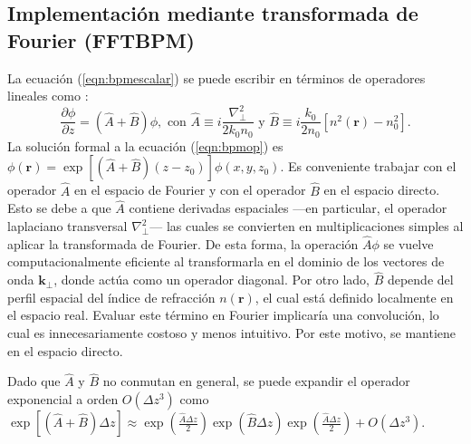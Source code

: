 \subsection{Implementación mediante transformada de Fourier (FFTBPM)}
La ecuación (\ref{eqn:bpmescalar}) se puede escribir en términos de operadores lineales como \citep{bpm}: 
\begin{equation}
	\frac{\partial \phi}{\partial z}  = \left(\hat{A} + \hat{B}\right)\phi, \text{ con } \hat{A} \equiv i\frac{\nabla^2_\perp}{2k_0n_0}\text{ y } \hat{B} \equiv i\frac{k_0}{2n_0}\left[n^2(\textbf{r})-n_0^2\right]. \label{eqn:bpmop}
\end{equation}
La solución formal a la ecuación (\ref{eqn:bpmop}) es $\phi(\textbf{r}) = \exp\left[\left(\hat{A} + \hat{B}\right)(z-z_0)\right]\phi(x, y, z_0)$. Es conveniente trabajar con el operador \( \hat{A} \) en el espacio de Fourier y con el operador \( \hat{B} \) en el espacio directo. Esto se debe a que \( \hat{A} \) contiene derivadas espaciales —en particular, el operador laplaciano transversal \( \nabla^2_\perp \)— las cuales se convierten en multiplicaciones simples al aplicar la transformada de Fourier. De esta forma, la operación \( \hat{A} \phi \) se vuelve computacionalmente eficiente al transformarla en el dominio de los vectores de onda \( \textbf{k}_\perp \), donde actúa como un operador diagonal. Por otro lado, \( \hat{B} \) depende del perfil espacial del índice de refracción \( n(\textbf{r}) \), el cual está definido localmente en el espacio real. Evaluar este término en Fourier implicaría una convolución, lo cual es innecesariamente costoso y menos intuitivo. Por este motivo, se mantiene en el espacio directo. 

Dado que $\hat{A}$ y $\hat{B}$ no conmutan en general, se puede expandir el operador exponencial a orden $O(\Delta z ^3)$ como $\exp\left[\left(\hat{A} + \hat{B}\right)\Delta z \right] \approx \exp\left(\frac{\hat{A}\Delta z}{2} \right)\exp\left(\hat{B}\Delta z \right)\exp\left(\frac{\hat{A}\Delta z}{2} \right) + O(\Delta z ^3)$.

